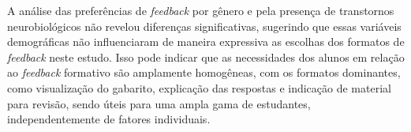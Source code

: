 A análise das preferências de \textit{feedback} por gênero e pela presença de transtornos neurobiológicos não revelou diferenças significativas, sugerindo que essas variáveis demográficas não influenciaram de maneira expressiva as escolhas dos formatos de \textit{feedback} neste estudo. Isso pode indicar que as necessidades dos alunos em relação ao \textit{feedback} formativo são amplamente homogêneas, com os formatos dominantes, como visualização do gabarito, explicação das respostas e indicação de material para revisão, sendo úteis para uma ampla gama de estudantes, independentemente de fatores individuais.